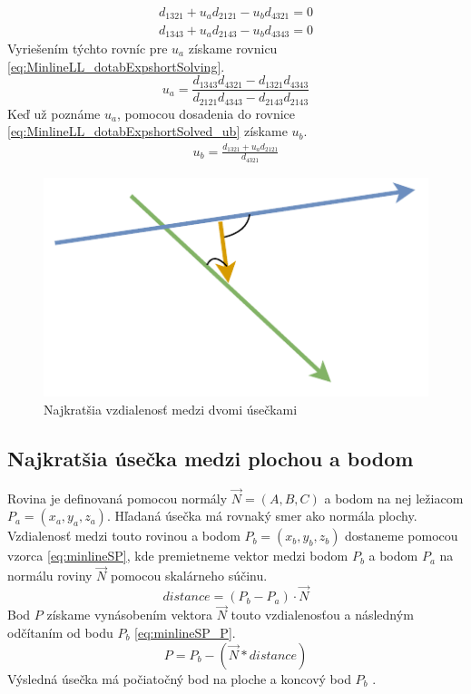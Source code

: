 \begin{equation}
\begin{aligned}
d_{1321} + u_a d_{2121} - u_b d_{4321} = 0\\
d_{1343} + u_a d_{2143} - u_b d_{4343} = 0
\end{aligned}
    \label{eq:MinlineLL_dotabExpshort}
\end{equation}
Vyriešením týchto rovníc pre $u_a$ získame rovnicu \ref{eq:MinlineLL_dotabExpshortSolving}.
\begin{equation}
 u_a= \frac
 {d_{1343} d_{4321} - d_{1321} d_{4343} }
 {d_{2121} d_{4343} - d_{2143} d_{2143} }
    \label{eq:MinlineLL_dotabExpshortSolving}
\end{equation}
Keď už poznáme $u_a$, pomocou dosadenia do rovnice \ref{eq:MinlineLL_dotabExpshortSolved_ub} získame $u_b$.
\begin{equation}
\begin{aligned}
u_b  = \frac{d_{1321} + u_a d_{2121}}{d_{4321}}
\end{aligned}
    \label{eq:MinlineLL_dotabExpshortSolved_ub}
\end{equation}



\begin{figure}[H]
	\centering
	\includegraphics[height=0.3\textwidth]{obrazky-figures/Diagram/Draw/2Line/DP Navrh operacii-1D - LineMinLL.pdf}
	\caption{Najkratšia vzdialenosť medzi dvomi úsečkami}
	\label{fig:LineMinLL}
\end{figure}


\subsection*{Najkratšia úsečka medzi plochou a bodom}


Rovina je definovaná pomocou normály $\overrightarrow{N}=(A, B, C)$ a bodom na nej ležiacom $P_a=(x_a,y_a,z_a)$.
Hľadaná úsečka má rovnaký smer ako normála plochy.
Vzdialenosť medzi touto rovinou a bodom $P_b=(x_b,y_b,z_b)$ dostaneme pomocou vzorca \ref{eq:minlineSP}, kde premietneme vektor medzi bodom $P_b$ a bodom $P_a$ na normálu roviny $\overrightarrow{N}$ pomocou skalárneho súčinu. 
\begin{equation}
 distance = (P_b - P_a) \cdot \overrightarrow{N}
    \label{eq:minlineSP}
\end{equation}
Bod $P$ získame vynásobením vektora $\overrightarrow{N}$ touto vzdialenosťou a následným odčítaním od bodu $P_b$ \ref{eq:minlineSP_P}.
\begin{equation}
 P = P_b - (\overrightarrow{N} * distance)
    \label{eq:minlineSP_P}
\end{equation}
Výsledná úsečka má počiatočný bod na ploche a koncový bod $P_b$ \cite{bourke_Point_Line_Plane}.


